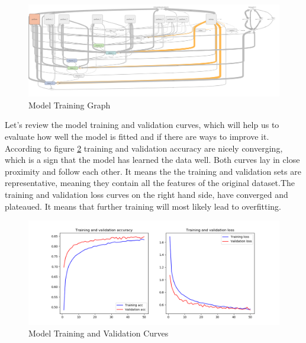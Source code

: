 \begin{Schunk}
\begin{figure}[H]

{\centering \includegraphics[width=1\linewidth]{../images/model_graph} 

}

\caption[Model Training Graph]{Model Training Graph}\label{fig:grah}
\end{figure}
\end{Schunk}

Let's review the model training and validation curves, which will help
us to evaluate how well the model is fitted and if there are ways to
improve it. According to figure \ref{fig:loss} training and validation
accuracy are nicely converging, which is a sign that the model has
learned the data well. Both curves lay in close proximity and follow
each other. It means the the training and validation sets are
representative, meaning they contain all the features of the original
dataset.The training and validation loss curves on the right hand side,
have converged and plateaued. It means that further training will most
likely lead to overfitting.

\begin{Schunk}
\begin{figure}[H]

{\centering \includegraphics[width=1\linewidth]{../images/Audio_DNN_train_val_curves} 

}

\caption[Model Training and Validation Curves]{Model Training and Validation Curves}\label{fig:loss}
\end{figure}
\end{Schunk}

